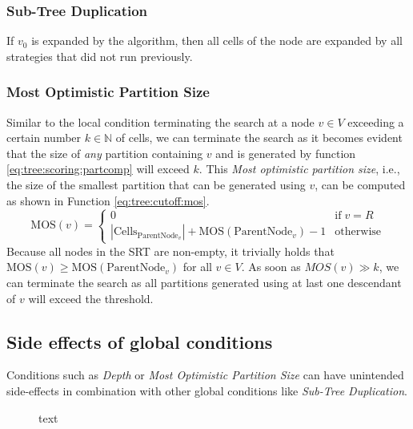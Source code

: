 			\subsubsection{Sub-Tree Duplication}
			
				If $v_0$ is expanded by the algorithm, then all cells of the node are expanded by all strategies that did not run previously.
				
			
			\subsubsection{Most Optimistic Partition Size}
			
				Similar to the local condition terminating the search at a node $v \in V$ exceeding a certain number $k \in \mathbb{N}$ of cells, we can terminate the search as it becomes evident that the size of \textit{any} partition containing $v$ and is generated by function \ref{eq:tree:scoring:partcomp} will exceed $k$.
				This \textit{Most optimistic partition size}, i.e., the size of the smallest partition that can be generated using $v$, can be computed as shown in Function \ref{eq:tree:cutoff:mos}.
				\begin{equation}
				\label{eq:tree:cutoff:mos}
					\mathrm{MOS}(v) = \begin{cases}
						0 & \text{if} \; v = R \\
						|\mathrm{Cells}_{\mathrm{ParentNode}_v}| + \mathrm{MOS}(\mathrm{ParentNode}_v) - 1 & \mathrm{otherwise}
					\end{cases}
				\end{equation}
				Because all nodes in the \ac{SRT} are non-empty, it trivially holds that $\mathrm{MOS}(v) \geq \mathrm{MOS}(\mathrm{ParentNode}_v)$ for all $v \in V$.
				As soon as $MOS(v) \gg k$, we can terminate the search as all partitions generated using at last one descendant of $v$ will exceed the threshold.
				
		\subsection{Side effects of global conditions}
				
			Conditions such as \textit{Depth} or \textit{Most Optimistic Partition Size} can have unintended side-effects in combination with other global conditions like \textit{Sub-Tree Duplication}.
			
			
			\begin{figure}[ht!]
				\centering
				
				\caption{text}
				\label{fig:tree:cutoff:mos}
			\end{figure}
		
